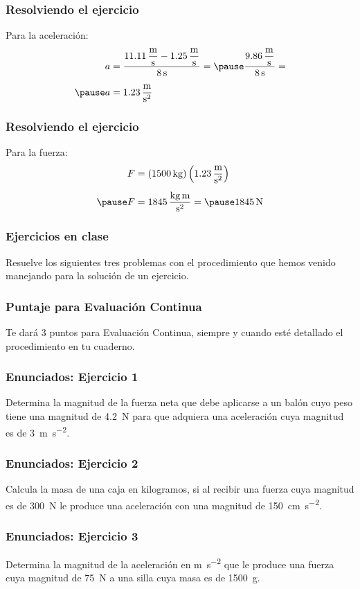 \documentclass[14pt]{beamer}
\begin{document}
\begin{frame}
\frametitle{Resolviendo el ejercicio}
 Para la aceleración:
\pause
\begin{eqnarray*}
\begin{aligned}
a &= \dfrac{ \displaystyle \SI[per-mode=fraction]{11.11}{\meter\per\second} - \SI[per-mode=fraction]{1.25}{\meter\per\second}}{\SI{8}{\second}} = \pause \dfrac{\displaystyle \SI[per-mode=fraction]{9.86}{\meter\per\second}}{\SI{8}{\second}} = \\[0.5em] \pause
a &= \SI[per-mode=fraction]{1.23}{\meter\per\square\second}
\end{aligned}
\end{eqnarray*}  
\end{frame}
\begin{frame}
\frametitle{Resolviendo el ejercicio}
 Para la fuerza:
\pause
\begin{eqnarray*}
\begin{aligned}
F &= \left( \SI{1500}{\kilo\gram} \right) \left( \SI[per-mode=fraction]{1.23}{\meter\per\square\second} \right) \\[0.5em] \pause
F &= \SI[per-mode=fraction]{1845}{\kilo\gram\meter\per\square\second} = \pause \SI{1845}{\newton}
\end{aligned}
\end{eqnarray*}  
\end{frame}
\begin{frame}
\frametitle{Ejercicios en clase}
Resuelve los siguientes tres problemas con el procedimiento que hemos venido manejando para la solución de un ejercicio.
\end{frame}
\begin{frame}
\frametitle{Puntaje para Evaluación Continua}
Te dará 3 puntos para Evaluación Continua, siempre y cuando esté detallado el procedimiento en tu cuaderno.
\end{frame}
\begin{frame}
\frametitle{Enunciados: Ejercicio 1}
Determina la magnitud de la fuerza neta que debe aplicarse a un balón cuyo peso tiene una magnitud de
\SI{4.2}{\newton} para que adquiera una aceleración cuya magnitud es de \SI{3}{\meter\per\square\second}.
\end{frame}
\begin{frame}
\frametitle{Enunciados: Ejercicio 2}
Calcula la masa de una caja en kilogramos, si al recibir una fuerza cuya magnitud es de \SI{300}{\newton} le produce una aceleración con una magnitud de \SI{150}{\centi\meter\per\square\second}.
\end{frame}
\begin{frame}
\frametitle{Enunciados: Ejercicio 3}
Determina la magnitud de la aceleración en \unit{\meter\per\square\second} que le produce una fuerza cuya magnitud de \SI{75}{\newton} a una silla cuya masa es de \SI{1500}{\gram}.
\end{frame}
\end{document}
